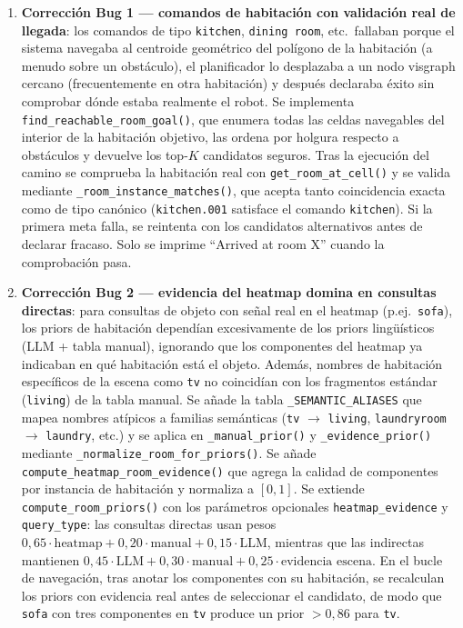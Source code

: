 \documentclass[11pt,a4paper]{article}
\begin{document}
\begin{enumerate}
  \item \textbf{Corrección Bug 1 — comandos de habitación con validación real de
        llegada}: los comandos de tipo \texttt{kitchen}, \texttt{dining room},
        etc.\ fallaban porque el sistema navegaba al centroide geométrico del polígono
        de la habitación (a menudo sobre un obstáculo), el planificador lo desplazaba a
        un nodo visgraph cercano (frecuentemente en otra habitación) y después declaraba
        éxito sin comprobar dónde estaba realmente el robot. Se implementa
        \texttt{find\_reachable\_room\_goal()}, que enumera todas las celdas
        navegables del interior de la habitación objetivo, las ordena por holgura
        respecto a obstáculos y devuelve los top-$K$ candidatos seguros. Tras la
        ejecución del camino se comprueba la habitación real con
        \texttt{get\_room\_at\_cell()} y se valida mediante
        \texttt{\_room\_instance\_matches()}, que acepta tanto coincidencia exacta como
        de tipo canónico (\texttt{kitchen.001} satisface el comando \texttt{kitchen}).
        Si la primera meta falla, se reintenta con los candidatos alternativos antes de
        declarar fracaso. Solo se imprime ``Arrived at room X'' cuando la comprobación
        pasa.

  \item \textbf{Corrección Bug 2 — evidencia del heatmap domina en consultas
        directas}: para consultas de objeto con señal real en el heatmap (p.ej.\
        \texttt{sofa}), los priors de habitación dependían excesivamente de los
        priors lingüísticos (LLM + tabla manual), ignorando que los componentes del
        heatmap ya indicaban en qué habitación está el objeto. Además, nombres de
        habitación específicos de la escena como \texttt{tv} no coincidían con los
        fragmentos estándar (\texttt{living}) de la tabla manual. Se añade la tabla
        \texttt{\_SEMANTIC\_ALIASES} que mapea nombres atípicos a familias semánticas
        (\texttt{tv} $\to$ \texttt{living}, \texttt{laundryroom} $\to$
        \texttt{laundry}, etc.) y se aplica en \texttt{\_manual\_prior()} y
        \texttt{\_evidence\_prior()} mediante \texttt{\_normalize\_room\_for\_priors()}.
        Se añade \texttt{compute\_heatmap\_room\_evidence()} que agrega la calidad de
        componentes por instancia de habitación y normaliza a $[0,1]$. Se extiende
        \texttt{compute\_room\_priors()} con los parámetros opcionales
        \texttt{heatmap\_evidence} y \texttt{query\_type}: las consultas directas usan
        pesos $0{,}65 \cdot \text{heatmap} + 0{,}20 \cdot \text{manual} + 0{,}15
        \cdot \text{LLM}$, mientras que las indirectas mantienen
        $0{,}45 \cdot \text{LLM} + 0{,}30 \cdot \text{manual} + 0{,}25 \cdot
        \text{evidencia escena}$. En el bucle de navegación, tras anotar los
        componentes con su habitación, se recalculan los priors con evidencia real
        antes de seleccionar el candidato, de modo que \texttt{sofa} con tres
        componentes en \texttt{tv} produce un prior $>0{,}86$ para \texttt{tv}.


\end{enumerate}
\end{document}
